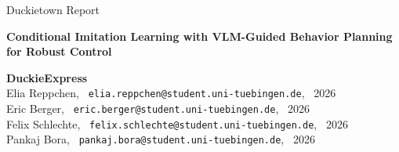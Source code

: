 


\vspace*{30ex}
Duckietown Report

{\huge\bf\textsf{Conditional Imitation Learning with VLM-Guided Behavior Planning for Robust Control}}

\vspace*{20ex}

\textbf{DuckieExpress} \\
Elia Reppchen,~ \verb+elia.reppchen@student.uni-tuebingen.de+,~ 2026 \\
Eric Berger,~ \verb+eric.berger@student.uni-tuebingen.de+,~ 2026 \\
Felix Schlechte,~ \verb+felix.schlechte@student.uni-tuebingen.de+,~ 2026 \\
Pankaj Bora,~ \verb+pankaj.bora@student.uni-tuebingen.de+,~ 2026 

\newpage


